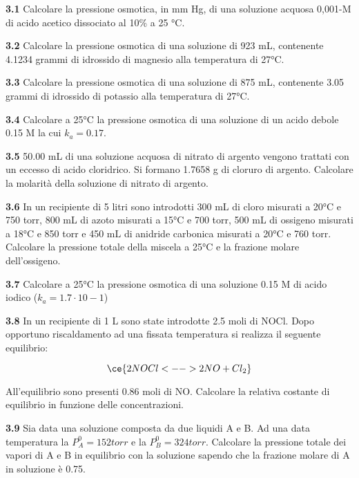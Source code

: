 \textbf{3.1} Calcolare la pressione osmotica, in mm Hg, di una soluzione acquosa 0,001-M di acido acetico dissociato al 10\% a 25 °C.

\vspace{0.2cm}\textbf{3.2} Calcolare la pressione osmotica di una soluzione di 923 mL, contenente 4.1234 grammi di idrossido di magnesio alla temperatura di 27°C. 

\vspace{0.2cm}\textbf{3.3} Calcolare la pressione osmotica di una soluzione di 875 mL, contenente 3.05 grammi di idrossido
di potassio alla temperatura di 27°C.

\vspace{0.2cm}\textbf{3.4} Calcolare a 25°C la pressione osmotica di una soluzione di un acido debole 0.15 M la cui $k_a=0.17$.

\vspace{0.2cm}\textbf{3.5} 50.00 mL di una soluzione acquosa di nitrato di argento vengono trattati con un eccesso di acido
cloridrico. Si formano 1.7658 g di cloruro di argento. Calcolare la molarità della soluzione di nitrato
di argento.

\vspace{0.2cm}\textbf{3.6} In un recipiente di 5 litri sono introdotti 300 mL di cloro misurati a 20°C e 750 torr, 800 mL di azoto misurati a 15°C e 700 torr, 500 mL di ossigeno misurati a 18°C e 850 torr e 450 mL di anidride carbonica misurati a 20°C e 760 torr. Calcolare la pressione totale della miscela a 25°C e la frazione molare dell’ossigeno.

\vspace{0.2cm}\textbf{3.7} Calcolare a 25°C la pressione osmotica di una soluzione 0.15 M di acido iodico ($k_a= 1.7 \cdot 10-1 $)

\vspace{0.2cm}\textbf{3.8} In un recipiente di 1 L sono state introdotte 2.5 moli di NOCl. Dopo opportuno riscaldamento ad una fissata temperatura si realizza il seguente equilibrio:

$$\ce{2 NOCl <--> 2NO + Cl_2}$$

All’equilibrio sono presenti 0.86 moli di NO. Calcolare la relativa costante di equilibrio in funzione delle concentrazioni.

\vspace{0.2cm}\textbf{3.9} Sia data una soluzione composta da due liquidi A e B. Ad una data temperatura la $P^0_A = 152 torr$
e la $P^0_B = 324 torr$. Calcolare la pressione totale dei vapori di A e B in equilibrio con la soluzione sapendo che la frazione molare di A in soluzione è 0.75.

